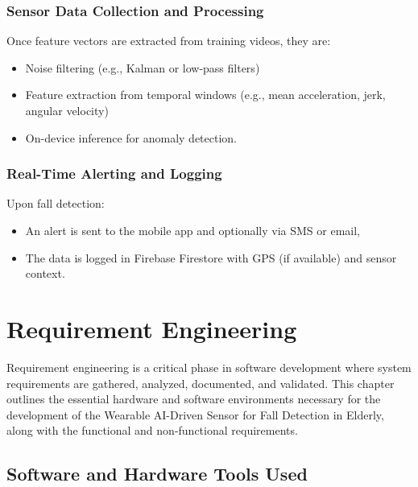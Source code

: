 \documentclass[a4paper, 12pt]{report}
\begin{document}
\subsection{Sensor Data Collection and Processing}
Once feature vectors are extracted from training videos, they are:
\begin{itemize}[itemsep=-4pt]
    \item Noise filtering (e.g., Kalman or low-pass filters)
    \item Feature extraction from temporal windows (e.g., mean acceleration, jerk, angular velocity)
    \item On-device inference for anomaly detection.
\end{itemize}



\subsection{ Real-Time Alerting and Logging}
Upon fall detection:
\begin{itemize}[itemsep=-4pt]
    \item  An alert is sent to the mobile app and optionally via SMS or email,
    \item  The data is logged in Firebase Firestore with GPS (if available) and sensor context.
\end{itemize}


\chapter{Requirement Engineering}

Requirement engineering is a critical phase in software development where system requirements are gathered, analyzed, documented, and validated. This chapter outlines the essential hardware and software environments necessary for the development of the Wearable AI-Driven Sensor for Fall Detection in Elderly, along with the functional and non-functional requirements.

\section{Software and Hardware Tools Used}
\end{document}
